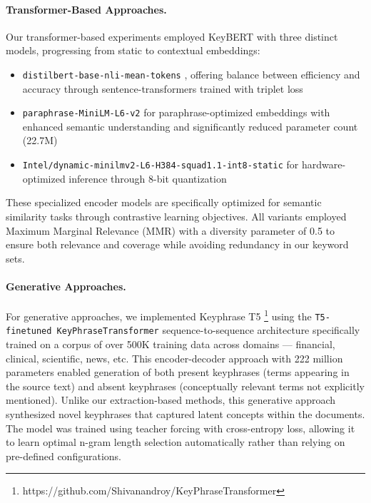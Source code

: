 \documentclass[sigconf]{acmart}
\begin{document}
\paragraph{Transformer-Based Approaches.}
Our transformer-based experiments employed KeyBERT \cite{grootendorst2020keybert} with three distinct models, progressing from static to contextual embeddings:
\begin{itemize}
    \item \texttt{distilbert-base-nli-mean-tokens} \cite{DBLP:journals/corr/abs-1910-01108}, offering balance between efficiency and accuracy through sentence-transformers trained with triplet loss
    \item \texttt{paraphrase-MiniLM-L6-v2} \cite{DBLP:conf/acl/WangBHDW21} for paraphrase-optimized embeddings with enhanced semantic understanding and significantly reduced parameter count (22.7M)
    \item \texttt{Intel/dynamic-minilmv2-L6-H384-squad1.1-int8-static} \cite{DBLP:journals/corr/abs-2210-17114} for hardware-optimized inference through 8-bit quantization
\end{itemize}

These specialized encoder models are specifically optimized for semantic similarity tasks through contrastive learning objectives. All variants employed Maximum Marginal Relevance (MMR) \cite{DBLP:conf/sigir/CarbonellG98} with a diversity parameter of 0.5 to ensure both relevance and coverage while avoiding redundancy in our keyword sets.

\paragraph{Generative Approaches.}
For generative approaches, we implemented Keyphrase T5 \footnote{https://github.com/Shivanandroy/KeyPhraseTransformer} using the \texttt{T5-finetuned KeyPhraseTransformer} sequence-to-sequence architecture \cite{DBLP:journals/jmlr/RaffelSRLNMZLL20} specifically trained on a corpus of over 500K training data across domains — financial, clinical, scientific, news, etc. This encoder-decoder approach with 222 million parameters enabled generation of both present keyphrases (terms appearing in the source text) and absent keyphrases (conceptually relevant terms not explicitly mentioned). Unlike our extraction-based methods, this generative approach synthesized novel keyphrases that captured latent concepts within the documents. The model was trained using teacher forcing with cross-entropy loss, allowing it to learn optimal n-gram length selection automatically rather than relying on pre-defined configurations.
\end{document}

